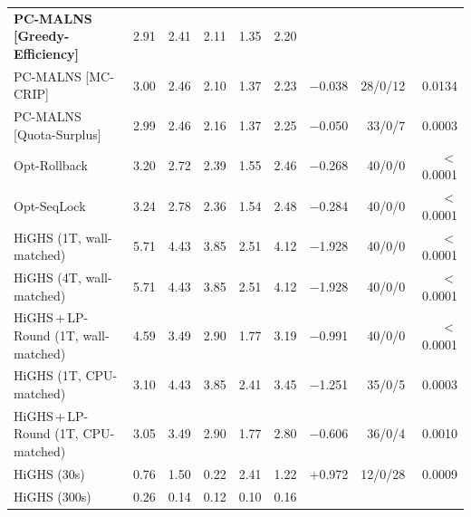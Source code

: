 \begin{table}[pos=!htb]
\begin{tabular}{@{}lrrrrrrrr@{}}
\textbf{PC-MALNS [Greedy-Efficiency]} & 2.91 & 2.41 & 2.11 & 1.35 & 2.20 &  &  &  \\
PC-MALNS [MC-CRIP] & 3.00 & 2.46 & 2.10 & 1.37 & 2.23 & $-$0.038 & 28/0/12 & 0.0134 \\
PC-MALNS [Quota-Surplus] & 2.99 & 2.46 & 2.16 & 1.37 & 2.25 & $-$0.050 & 33/0/7 & 0.0003 \\
Opt-Rollback & 3.20 & 2.72 & 2.39 & 1.55 & 2.46 & $-$0.268 & 40/0/0 & $<$0.0001 \\
Opt-SeqLock & 3.24 & 2.78 & 2.36 & 1.54 & 2.48 & $-$0.284 & 40/0/0 & $<$0.0001 \\
HiGHS (1T, wall-matched) & 5.71 & 4.43 & 3.85 & 2.51 & 4.12 & $-$1.928 & 40/0/0 & $<$0.0001 \\
HiGHS (4T, wall-matched) & 5.71 & 4.43 & 3.85 & 2.51 & 4.12 & $-$1.928 & 40/0/0 & $<$0.0001 \\
HiGHS\,+\,LP-Round (1T, wall-matched) & 4.59 & 3.49 & 2.90 & 1.77 & 3.19 & $-$0.991 & 40/0/0 & $<$0.0001 \\
HiGHS (1T, CPU-matched) & 3.10 & 4.43 & 3.85 & 2.41 & 3.45 & $-$1.251 & 35/0/5 & 0.0003 \\
HiGHS\,+\,LP-Round (1T, CPU-matched) & 3.05 & 3.49 & 2.90 & 1.77 & 2.80 & $-$0.606 & 36/0/4 & 0.0010 \\
HiGHS (30s) & 0.76 & 1.50 & 0.22 & 2.41 & 1.22 & +0.972 & 12/0/28 & 0.0009 \\
HiGHS (300s) & 0.26 & 0.14 & 0.12 & 0.10 & 0.16 &  &  &  \\
\bottomrule
\end{tabular}
\end{table}
